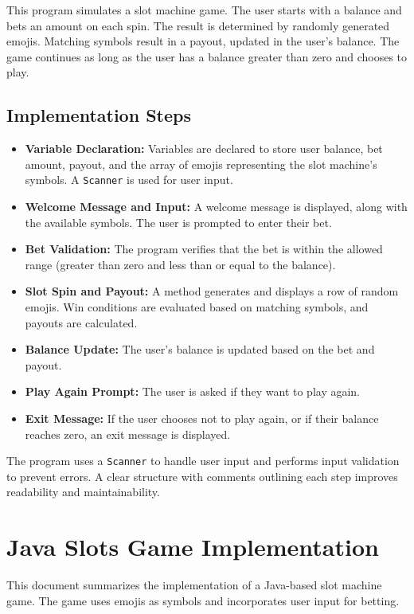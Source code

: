 \documentclass{article}
\begin{document}
This program simulates a slot machine game.  The user starts with a balance and bets an amount on each spin.  The result is determined by randomly generated emojis.  Matching symbols result in a payout, updated in the user's balance.  The game continues as long as the user has a balance greater than zero and chooses to play.


\subsection{Implementation Steps}

\begin{itemize}
    \item \textbf{Variable Declaration:}  Variables are declared to store user balance, bet amount, payout, and the array of emojis representing the slot machine's symbols. A \texttt{Scanner} is used for user input.
    \item \textbf{Welcome Message and Input:} A welcome message is displayed, along with the available symbols.  The user is prompted to enter their bet.
    \item \textbf{Bet Validation:}  The program verifies that the bet is within the allowed range (greater than zero and less than or equal to the balance).
    \item \textbf{Slot Spin and Payout:} A method generates and displays a row of random emojis.  Win conditions are evaluated based on matching symbols, and payouts are calculated.
    \item \textbf{Balance Update:} The user's balance is updated based on the bet and payout.
    \item \textbf{Play Again Prompt:}  The user is asked if they want to play again.
    \item \textbf{Exit Message:} If the user chooses not to play again, or if their balance reaches zero, an exit message is displayed.
\end{itemize}

The program uses a \texttt{Scanner} to handle user input and performs input validation to prevent errors.  A clear structure with comments outlining each step improves readability and maintainability.


\section{Java Slots Game Implementation}

This document summarizes the implementation of a Java-based slot machine game.  The game uses emojis as symbols and incorporates user input for betting.
\end{document}
